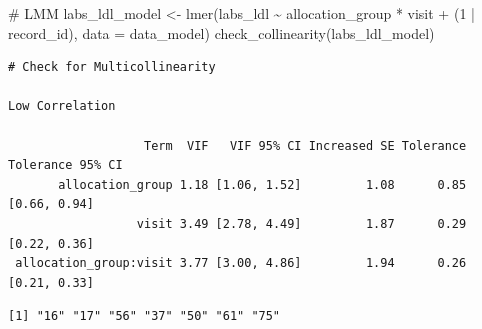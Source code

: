 \documentclass[
  12pt,
]{article}
\newenvironment{Shaded}{\begin{snugshade}}{\end{snugshade}}
\newcommand{\AttributeTok}[1]{\textcolor[rgb]{0.40,0.45,0.13}{#1}}
\newcommand{\CommentTok}[1]{\textcolor[rgb]{0.37,0.37,0.37}{#1}}
\newcommand{\DecValTok}[1]{\textcolor[rgb]{0.68,0.00,0.00}{#1}}
\newcommand{\FunctionTok}[1]{\textcolor[rgb]{0.28,0.35,0.67}{#1}}
\newcommand{\NormalTok}[1]{\textcolor[rgb]{0.00,0.23,0.31}{#1}}
\newcommand{\OtherTok}[1]{\textcolor[rgb]{0.00,0.23,0.31}{#1}}
\newcommand{\SpecialCharTok}[1]{\textcolor[rgb]{0.37,0.37,0.37}{#1}}
\newcommand{\StringTok}[1]{\textcolor[rgb]{0.13,0.47,0.30}{#1}}
\begin{document}
\begin{Shaded}
\begin{Highlighting}[]
\CommentTok{\# LMM}
\NormalTok{labs\_ldl\_model }\OtherTok{\textless{}{-}} \FunctionTok{lmer}\NormalTok{(labs\_ldl }\SpecialCharTok{\textasciitilde{}}\NormalTok{ allocation\_group }\SpecialCharTok{*}\NormalTok{ visit }\SpecialCharTok{+} 
\NormalTok{(}\DecValTok{1} \SpecialCharTok{|}\NormalTok{ record\_id), }\AttributeTok{data =}\NormalTok{ data\_model)}
\FunctionTok{check\_collinearity}\NormalTok{(labs\_ldl\_model)}
\end{Highlighting}
\end{Shaded}

\begin{verbatim}
# Check for Multicollinearity

Low Correlation

                   Term  VIF   VIF 95% CI Increased SE Tolerance Tolerance 95% CI
       allocation_group 1.18 [1.06, 1.52]         1.08      0.85     [0.66, 0.94]
                  visit 3.49 [2.78, 4.49]         1.87      0.29     [0.22, 0.36]
 allocation_group:visit 3.77 [3.00, 4.86]         1.94      0.26     [0.21, 0.33]
\end{verbatim}

\begin{Shaded}
\end{Shaded}

\begin{verbatim}
[1] "16" "17" "56" "37" "50" "61" "75"
\end{verbatim}
\end{document}
